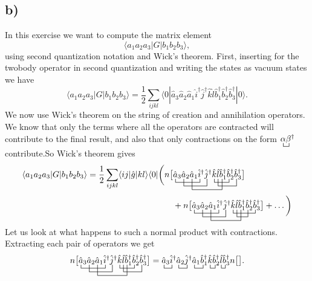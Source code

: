 \documentclass[a4paper, 11pt, notitlepage, english]{article}
\newcommand{\bra}[1]{\langle #1|}
\newcommand{\op}[1]{\hat{#1}}
\newcommand{\braopket}[3]{\langle #1 | {#2} | #3 \rangle}
\begin{document}
\subsection*{b)}
In this exercise we want to compute the matrix element
$$\braopket{a_1a_2a_3}{G}{b_1b_2b_3},$$
using second quantization notation and Wick's theorem. First, inserting for the twobody operator in second quantization and writing the states as vacuum states we have
$$\braopket{a_1a_2a_3}{G}{b_1b_2b_3} = \frac{1}{2}\sum_{ijkl} \braopket{0}{\op{a}_3 \op{a}_2 \op{a}_1 \op{i}^\dag \op{j}^\dag \op{k} \op{l} \op{b}_1^\dag\op{b}_2^\dag\op{b}_3^\dag}{0}.$$
We now use Wick's theorem on the string of creation and annihilation operators. We know that only the terms where all the operators are contracted will contribute to the final result, and also that only contractions on the form $\bcontraction{}{\alpha}{}{\beta}\alpha \beta^\dag$ contribute.So Wick's theorem gives
\begin{align*}
\braopket{a_1a_2a_3}{G}{b_1b_2b_3} = \frac{1}{2}\sum_{ijkl} \braopket{ij}{\op{g}}{kl} \bra{0} \bigg(
&
%
n\big[
\bcontraction{}{a}{_1a_2 a_3}{i}
\bcontraction[2ex]{a_1}{a}{_2 a_3 i^\dag}{j}
\bcontraction[3ex]{a_1a_2}{a}{_3i^\dag j^\dag k l}{a}
\bcontraction[1ex]{a_1a_2a_3 i^\dag j^\dag}{k}{l b_1^\dag }{b}
\bcontraction[2ex]{a_1a_2a_3 i^\dag j^\dag k}{l}{b_1^\dag b_2^\dag}{b}
\op{a}_3 \op{a}_2 \op{a}_1 \op{i}^\dag \op{j}^\dag \op{k} \op{l} \op{b}_1^\dag\op{b}_2^\dag\op{b}_3^\dag\big] \\[0.1cm]
%
%
&\quad+n\big[
\bcontraction{}{a}{_1a_2 a_3}{i}
\bcontraction[2ex]{a_1}{a}{_2 a_3 i^\dag}{j}
\bcontraction[3ex]{a_1a_2}{a}{_3i^\dag j^\dag k l}{a}
\bcontraction[1ex]{a_1a_2a_3 i^\dag j^\dag}{k}{l b_1^\dag b_2^\dag}{b}
\bcontraction[2ex]{a_1a_2a_3 i^\dag j^\dag k}{l}{b_1^\dag}{b}
\op{a}_3 \op{a}_2 \op{a}_1 \op{i}^\dag \op{j}^\dag \op{k} \op{l} \op{b}_1^\dag\op{b}_2^\dag\op{b}_3^\dag\big] +\ldots \bigg)
\end{align*}
Let us look at what happens to such a normal product with contractions. Extracting each pair of operators we get
$$n\big[
\bcontraction{}{a}{_1a_2 a_3}{i}
\bcontraction[2ex]{a_1}{a}{_2 a_3 i^\dag}{j}
\bcontraction[3ex]{a_1a_2}{a}{_3i^\dag j^\dag k l}{b}
\bcontraction[1ex]{a_1a_2a_3 i^\dag j^\dag}{k}{l b_1^\dag}{b}
\bcontraction[2ex]{a_1a_2a_3 i^\dag j^\dag k}{l}{b_1^\dag b_2^\dag}{b}
\op{a}_3 \op{a}_2 \op{a}_1 \op{i}^\dag \op{j}^\dag \op{k} \op{l} \op{b}_1^\dag\op{b}_2^\dag\op{b}_3^\dag\big] = 
%
\bcontraction{}{a}{_3}{i} \op{a}_3\op{i}^\dag
\bcontraction{}{a}{_2}{j} \op{a}_2\op{j}^\dag
\bcontraction{}{a}{_1}{a} \op{a}_1\op{b}_1^\dag
\bcontraction{}{k}{}{a} \op{k}\op{b}_2^\dag
\bcontraction{}{l}{}{a} \op{l}\op{b}_3^\dag n\big[\big].
$$ 
\end{document}
